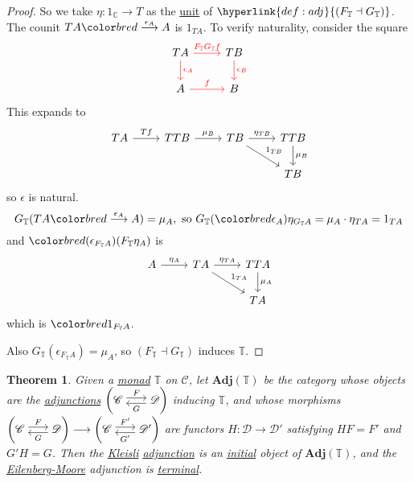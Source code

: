 \documentclass{article}
\makeatletter
\def\mathcolor#1#{\@mathcolor{#1}}
\def\@mathcolor#1#2#3{%
  \protect\leavevmode
  \begingroup
    \color#1{#2}#3%
  \endgroup
}
\newcommand{\green}[1]{\mathcolor{bred}{#1}}
\newcommand{\cc}{\mathscr{C}}
\newcommand{\dc}{\mathscr{D}}
\newenvironment{tikzcdi}{\begin{tikzcd}[cramped, sep=scriptsize]}{\end{tikzcd}}
\let\to\longrightarrow
\newtheorem{nthm}{Theorem}[section]
\makeatother
\begin{document}
\begin{proof}
  So we take $\eta: 1_\mathbb{C} \to T$ as the \hyperlink{def:unit}{unit} of $\hyperlink{def:adj}{(F_\mathbb{T} \dashv G_\mathbb{T})}$.
  The counit $TA \green{\overset{\epsilon_A}\to} A$ is $1_{TA}$. To verify naturality, consider the square
  \begin{equation*}
    \begin{tikzcd}
      TA \rar[red]{F_\mathbb{T}G_\mathbb{T}f} \dar[red]{\epsilon_A} & TB \dar[red]{\epsilon_B} \\
      A \rar[red]{f} & B
    \end{tikzcd}
  \end{equation*}
  This expands to
  \begin{equation*}
    \begin{tikzcd}
      TA \rar{Tf} & TTB \rar{\mu_B} & TB \rar{\eta_{TB}} \drar{1_{TB}} &TTB \dar{\mu_B} \\
                  &               &                               &TB
    \end{tikzcd}
  \end{equation*}
  so $\epsilon$ is natural.
  \begin{equation*}
    G_\mathbb{T}(TA \green{\overset{\epsilon_A}\to} A) = \mu_A, \text{ so } G_\mathbb{T}(\green{\epsilon_A}) \eta_{G_\mathbb{T}A} = \mu_A \cdot \eta_{TA} = 1_{TA}
  \end{equation*}
  and $\green{(\epsilon_{F_\mathbb{T}A})(F_\mathbb{T}\eta_A)}$ is
  \begin{equation*}
  \begin{tikzcd}
    A \rar{\eta_A} & TA \rar{\eta_{TA}} \drar{1_{TA}} & TTA \dar{\mu_A} \\ &&TA
  \end{tikzcd}
  \end{equation*}
  which is $\green{1_{F_\mathbb{T}A}}$.

  Also $G_\mathbb{T}(\epsilon_{F_\mathbb{T}A}) = \mu_A$, so $(F_\mathbb{T} \dashv G_\mathbb{T})$ induces $\mathbb{T}$.
\end{proof}
\begin{nthm}\label{thm:5.7}
  Given a \hyperlink{def:monad}{monad} $\mathbb{T}$ on $\cc$, let $\mathbf{Adj}(\mathbb{T})$ be the category whose objects are the \hyperlink{def:adj}{adjunctions} $\left(\begin{tikzcdi}\cc \rar[shift left]{F} & \dc \lar[shift left]{G}\end{tikzcdi}\right)$ inducing $\mathbb{T}$, and whose morphisms $\left(\begin{tikzcdi}\cc \rar[shift left]{F} & \dc \lar[shift left]{G}\end{tikzcdi}\right)\to \left(\begin{tikzcdi}\cc \rar[shift left]{F'} & \dc' \lar[shift left]{G'}\end{tikzcdi}\right)$ are functors $H: \dc \to \dc'$ satisfying $HF = F'$ and $G'H = G$.
  Then the \hyperlink{def:kleisli}{Kleisli} \hyperlink{def:adj}{adjunction} is an \hyperlink{def:initial}{initial} object of $\mathbf{Adj}(\mathbb{T})$, and the \hyperlink{def:em}{Eilenberg-Moore} adjunction is \hyperlink{def:terminal}{terminal}.
\end{nthm}
\end{document}
